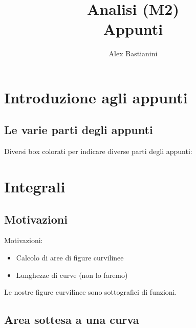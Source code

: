 \documentclass{report}
\title{\Huge{Analisi (M2)}\\Appunti}
\author{\huge{Alex Bastianini}}
\date{}
\begin{document}
\maketitle
\newpage%
\tableofcontents
\pagebreak

\chapter{Introduzione agli appunti}
\section{Le varie parti degli appunti}
Diversi box colorati per indicare diverse parti degli appunti:

\chapter{Integrali}
\section{Motivazioni}
Motivazioni:
\begin{itemize}
\item Calcolo di aree di figure curvilinee
\item Lunghezze di curve (non lo faremo)
\end{itemize}
Le nostre figure curvilinee sono sottografici di funzioni.
\section{Area sottesa a una curva}
\end{document}
